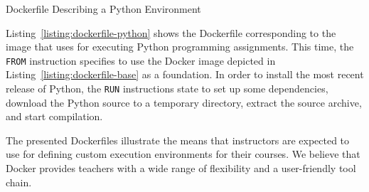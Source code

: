 \begin{listing}
\inputminted[frame=lines]{Dockerfile}{listings/Dockerfile-python}
\vspace{-0.33cm}
\caption{Dockerfile Describing a Python Environment}
\label{listing:dockerfile-python}
\end{listing}

Listing~\ref{listing:dockerfile-python} shows the Dockerfile corresponding to the image that \tool uses for executing Python programming assignments. This time, the \texttt{FROM} instruction specifies to use the Docker image depicted in Listing~\ref{listing:dockerfile-base} as a foundation. In order to install the most recent release of Python, the \texttt{RUN} instructions state to set up some dependencies, download the Python source to a temporary directory, extract the source archive, and start compilation.

The presented Dockerfiles illustrate the means that instructors are expected to use for defining custom execution environments for their courses. We believe that Docker provides teachers with a wide range of flexibility and a user-friendly tool chain.
